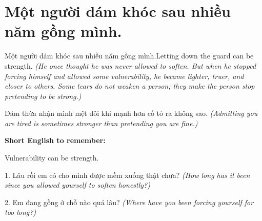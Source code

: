\section{Một người dám khóc sau nhiều năm gồng mình.}
\begin{truyen}{Một người dám khóc sau nhiều năm gồng mình.}{Letting down the guard can be strength.}
\textit{(He once thought he was never allowed to soften. But when he stopped forcing himself and allowed some vulnerability, he became lighter, truer, and closer to others. Some tears do not weaken a person; they make the person stop pretending to be strong.)}
\end{truyen}
\begin{baihoc}
Dám thừa nhận mình mệt đôi khi mạnh hơn cố tỏ ra không sao.
\textit{(Admitting you are tired is sometimes stronger than pretending you are fine.)}
\end{baihoc}
\begin{ghinhoanh}
\textbf{Short English to remember:}

Vulnerability can be strength.
\end{ghinhoanh}
\begin{tuhocnhanh}
1. Lâu rồi em có cho mình được mềm xuống thật chưa? \textit{(How long has it been since you allowed yourself to soften honestly?)}

2. Em đang gồng ở chỗ nào quá lâu? \textit{(Where have you been forcing yourself for too long?)}
\end{tuhocnhanh}
\ngancach

